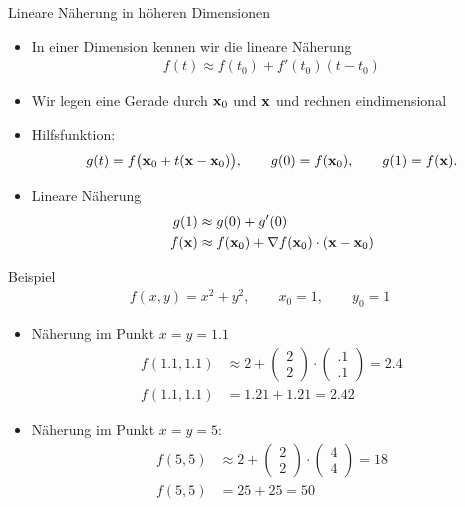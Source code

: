 \begin{frame}{Lineare Näherung in höheren Dimensionen}
  \begin{itemize}
  \item In einer Dimension kennen wir die lineare Näherung
    \begin{gather*}
      f(t) \approx f(t_0) + f'(t_0) (t-t_0)
    \end{gather*}
    \pause
  \item Wir legen eine Gerade durch $\mathbf{x}_0$ und $\mathbf{x}$ und rechnen eindimensional
  \item Hilfsfunktion:
    \begin{gather*}
      g(t) = f\bigl(\mathbf{x}_0+t(\mathbf{x}-\mathbf{x}_0)\bigr),
      \qquad g(0) = f(\mathbf{x}_0),
      \qquad g(1) = f(\mathbf{x}).
    \end{gather*}
  \item Lineare Näherung
    \begin{align*}
      g(1) & \approx g(0) + g'(0) \\
      f(\mathbf{x}) &\approx f(\mathbf{x}_0) + \nabla f(\mathbf{x}_0)\cdot(\mathbf{x}-\mathbf{x}_0)
    \end{align*}
  \end{itemize}
\end{frame}

\begin{frame}{Beispiel}
  \begin{gather*}
    f(x,y) = x^2 + y^2,\qquad x_0 = 1,\qquad y_0 = 1
  \end{gather*}
  \begin{itemize}
  \item Näherung im Punkt $x=y=1.1$
    \begin{align*}
      f(1.1,1.1)
      &\approx 2 +
        \begin{pmatrix}
          2\\2
        \end{pmatrix}
      \cdot
      \begin{pmatrix}
        .1\\.1
      \end{pmatrix}
      = 2.4\\
      f(1.1,1.1) &= 1.21+1.21 = 2.42
    \end{align*}
    \pause
  \item Näherung im Punkt $x=y=5$:
    \begin{align*}
      f(5,5)
      &\approx 2+
        \begin{pmatrix}
          2\\2
        \end{pmatrix}
      \cdot
      \begin{pmatrix}
        4\\4
      \end{pmatrix}
      = 18\\
      f(5,5) &= 25+25 = 50
    \end{align*}
  \end{itemize}
\end{frame}

